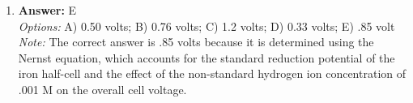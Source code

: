 \documentclass[12pt]{article}
\begin{document}
\begin{enumerate}[label=\arabic*.]
\\ \textit{Note:} The 2 p peak has the lowest energy because it corresponds to the outermost electrons of carbon, which are at a higher energy level compared to the more tightly bound core electrons represented by the other peaks.
\item \textbf{Answer:} E
\\ \textit{Options:} A) 0.50 volts; B) 0.76 volts; C) 1.2 volts; D) 0.33 volts; E) .85 volt
\\ \textit{Note:} The correct answer is .85 volts because it is determined using the Nernst equation, which accounts for the standard reduction potential of the iron half-cell and the effect of the non-standard hydrogen ion concentration of .001 M on the overall cell voltage.
\end{enumerate}
\end{document}
